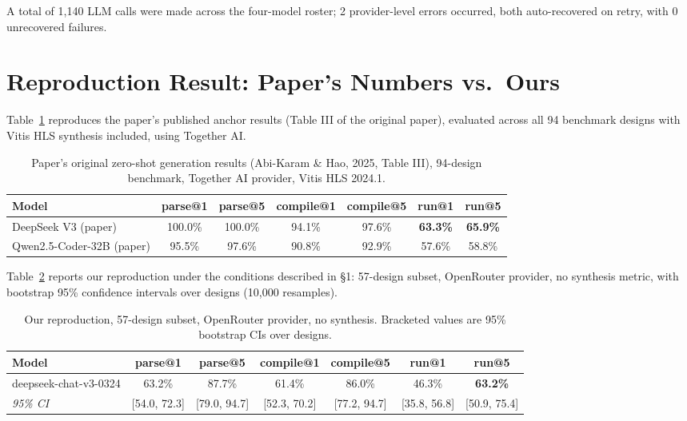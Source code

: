 \documentclass[11pt]{article}
\begin{document}
A total of 1{,}140 LLM calls were made across the four-model roster;
2 provider-level errors occurred, both auto-recovered on retry, with
0 unrecovered failures.

\section{Reproduction Result: Paper's Numbers vs.\ Ours}

Table~\ref{tab:paper} reproduces the paper's published anchor results
(Table III of the original paper), evaluated across all 94 benchmark
designs with Vitis HLS synthesis included, using Together AI.

\begin{table}[h]
\centering
\begin{tabular}{@{}lcccccc@{}}
\toprule
\textbf{Model} & \textbf{parse@1} & \textbf{parse@5} & \textbf{compile@1} & \textbf{compile@5} & \textbf{run@1} & \textbf{run@5} \\
\midrule
DeepSeek V3 (paper) & 100.0\% & 100.0\% & 94.1\% & 97.6\% & \textbf{63.3\%} & \textbf{65.9\%} \\
Qwen2.5-Coder-32B (paper) & 95.5\% & 97.6\% & 90.8\% & 92.9\% & 57.6\% & 58.8\% \\
\bottomrule
\end{tabular}
\caption{Paper's original zero-shot generation results (Abi-Karam \&
Hao, 2025, Table III), 94-design benchmark, Together AI provider,
Vitis HLS 2024.1.}
\label{tab:paper}
\end{table}

Table~\ref{tab:mine} reports our reproduction under the conditions
described in \S1: 57-design subset, OpenRouter provider, no synthesis
metric, with bootstrap 95\% confidence intervals over designs (10{,}000
resamples).

\begin{table}[h]
\centering
\begin{tabular}{@{}lcccccc@{}}
\toprule
\textbf{Model} & \textbf{parse@1} & \textbf{parse@5} & \textbf{compile@1} & \textbf{compile@5} & \textbf{run@1} & \textbf{run@5} \\
\midrule
deepseek-chat-v3-0324 & 63.2\% & 87.7\% & 61.4\% & 86.0\% & 46.3\% & \textbf{63.2\%} \\
\emph{95\% CI} & \scriptsize{[54.0, 72.3]} & \scriptsize{[79.0, 94.7]} & \scriptsize{[52.3, 70.2]} & \scriptsize{[77.2, 94.7]} & \scriptsize{[35.8, 56.8]} & \scriptsize{[50.9, 75.4]} \\
\bottomrule
\end{tabular}
\caption{Our reproduction, 57-design subset, OpenRouter provider, no
synthesis. Bracketed values are 95\% bootstrap CIs over designs.}
\label{tab:mine}
\end{table}
\end{document}
